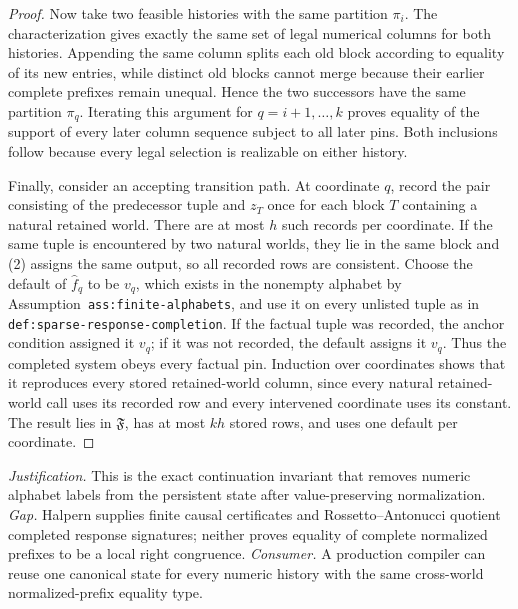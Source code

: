 \documentclass{article}
\begin{document}
\begin{proof}
Now take two feasible histories with the same partition \(\pi_i\). The characterization gives exactly the same set of legal numerical columns for both histories. Appending the same column splits each old block according to equality of its new entries, while distinct old blocks cannot merge because their earlier complete prefixes remain unequal. Hence the two successors have the same partition \(\pi_q\). Iterating this argument for \(q=i+1,\ldots,k\) proves equality of the support of every later column sequence subject to all later pins. Both inclusions follow because every legal selection is realizable on either history.

Finally, consider an accepting transition path. At coordinate \(q\), record the pair consisting of the predecessor tuple and \(z_T\) once for each block \(T\) containing a natural retained world. There are at most \(h\) such records per coordinate. If the same tuple is encountered by two natural worlds, they lie in the same block and (2) assigns the same output, so all recorded rows are consistent. Choose the default of \(\widehat f_q\) to be \(v_q\), which exists in the nonempty alphabet by Assumption~\texttt{ass:finite-alphabets}, and use it on every unlisted tuple as in \texttt{def:sparse-response-completion}. If the factual tuple was recorded, the anchor condition assigned it \(v_q\); if it was not recorded, the default assigns it \(v_q\). Thus the completed system obeys every factual pin. Induction over coordinates shows that it reproduces every stored retained-world column, since every natural retained-world call uses its recorded row and every intervened coordinate uses its constant. The result lies in \(\mathfrak F\), has at most \(kh\) stored rows, and uses one default per coordinate.
\end{proof}
\par\smallskip\noindent \textit{Justification.} This is the exact continuation invariant that removes numeric alphabet labels from the persistent state after value-preserving normalization. \textit{Gap.} Halpern supplies finite causal certificates and Rossetto--Antonucci quotient completed response signatures; neither proves equality of complete normalized prefixes to be a local right congruence. \textit{Consumer.} A production compiler can reuse one canonical state for every numeric history with the same cross-world normalized-prefix equality type.
\end{document}
